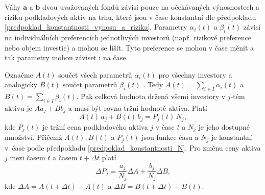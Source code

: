 \documentclass[a4paper,12pt]{report}
\theoremstyle{definition} \newtheorem{definice}[veta]{Definice}
\theoremstyle{remark}
\begin{document}
Váhy $\boldsymbol{a}$ a  $\boldsymbol{b}$ dvou uvažovaných fondů závisí pouze na očekávaných výnosnostech a riziku podkladových aktiv na trhu, které jsou v čase konstantní dle předpokladu \ref{predpoklad_konstantnosti_vynosu_a_rizika}.
Parametry $\alpha_i(t)$ a $\beta_i(t)$ závisí na individuálních preferencích jednotlivých investorů (např. rizikové preference nebo objem investic) a mohou se lišit.
Tyto preference se mohou v čase měnit a tak parametry mohou záviset i na čase.

Označme $A(t)$ součet všech parametrů $\alpha_i(t)$ pro všechny investory a analogicky $B(t)$ součet parametrů $\beta_i(t)$ .
Tedy $A(t)=\sum_{i\in I}\alpha_i(t)$ a $B(t)=\sum_{i\in I}\beta_i(t)$.
Pak celková hodnota držená všemi investory v $j$-tém aktivu je $Aa_j+Bb_j$ a musí být rovna tržní hodnotě aktiva.
Platí
$$A(t)\,a_j+B(t)\,b_j=P_j(t)\,N_j,$$
kde $P_j(t)$ je tržní cena podkladového aktiva $j$ v čase $t$ a $N_j$ je jeho dostupné množství.
Přičemž $A(t),B(t)$ a $ P_j(t)$ jsou funkce času a $N_j$ je konstantní v~čase podle předpokladu \ref{predpoklad_konstantnosti_N}.
Pro změnu ceny aktiva $j$ mezi časem $t$ a časem $t+\Delta t$ platí
\begin{displaymath}
\Delta P_j = \frac{a_j}{N_j}\Delta A + \frac{b_j}{N_j}\Delta B,
\end{displaymath}
kde $\Delta A = A(t+\Delta t) - A(t)$ a $\Delta B = B(t+\Delta t)- B(t)$.
\end{document}
